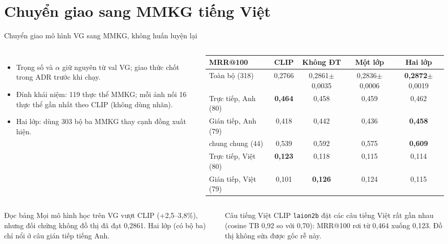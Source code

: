 \documentclass[10pt, aspectratio=169]{beamer}
\makeatletter
\newcommand{\code}[1]{\texttt{#1}}
\newcommand{\mrr}{MRR@100}
\newcommand{\pmm}{\ensuremath{\pm}}
\makeatother
\begin{document}
\section{Chuyển giao sang MMKG tiếng Việt}

\begin{frame}{Chuyển giao mô hình VG sang MMKG, không huấn luyện lại}
  \begin{columns}[T]
      \begin{itemize}\small
        \item Trọng số và $\alpha$ giữ nguyên từ val VG; giao thức chốt trong ADR trước khi chạy.
        \item Đỉnh khái niệm: 119 thực thể MMKG; mỗi ảnh nối 16 thực thể gần nhất theo CLIP (không dùng nhãn).
        \item Hai lớp: dùng 303 bộ ba MMKG thay cạnh đồng xuất hiện.
      \end{itemize}
      \centering\scriptsize\setlength{\tabcolsep}{3pt}
      \begin{tabular}{l c c c c}
        \toprule
        \textbf{\mrr} & \textbf{CLIP} & \textbf{Không ĐT} & \textbf{Một lớp} & \textbf{Hai lớp} \\
        \midrule
        Toàn bộ (318) & 0,2766 & 0,2861\pmm0,0035 & 0,2836\pmm0,0006 & \textbf{0,2872}\pmm0,0019 \\
        \midrule
        Trực tiếp, Anh (80) & \textbf{0,464} & 0,458 & 0,459 & 0,462 \\
        Gián tiếp, Anh (79) & 0,418 & 0,442 & 0,436 & \textbf{0,458} \\
        \quad chung chung (44) & 0,539 & 0,592 & 0,575 & \textbf{0,609} \\
        Trực tiếp, Việt (80) & \textbf{0,123} & 0,118 & 0,115 & 0,114 \\
        Gián tiếp, Việt (79) & 0,101 & \textbf{0,126} & 0,124 & 0,115 \\
        \bottomrule
      \end{tabular}
  \end{columns}
  \vfill
  \begin{columns}[T]
      \begin{block}{Đọc bảng}
        Mọi mô hình học trên VG vượt CLIP (+2,5--3,8\%), nhưng đối chứng không đồ thị đã đạt 0,2861. Hai lớp (có bộ ba) chỉ nổi ở câu gián tiếp tiếng Anh.
      \end{block}
      \begin{alertblock}{Câu tiếng Việt}
        CLIP \code{laion2b} đặt các câu tiếng Việt rất gần nhau (cosine TB 0,92 so với 0,70): \mrr{} rơi từ 0,464 xuống 0,123. Đồ thị không sửa được gốc rễ này.
      \end{alertblock}
  \end{columns}
\end{frame}
\end{document}
